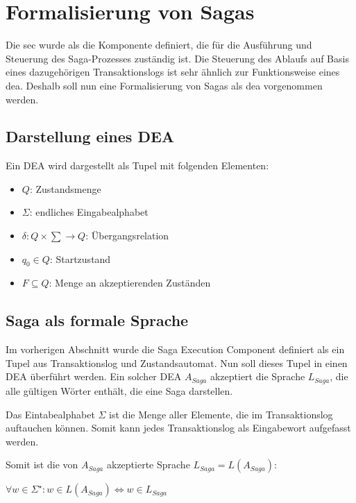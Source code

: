 \section{Formalisierung von Sagas} \label{sec_saga_formalisierung_dea}

Die \acrshort{sec} wurde als die Komponente definiert, die für die Ausführung und Steuerung des Saga-Prozesses zuständig ist. Die Steuerung des Ablaufs auf Basis eines dazugehörigen Transaktionslogs ist sehr ähnlich zur Funktionsweise eines \acrfull{dea}. Deshalb soll nun eine Formalisierung von Sagas als \acrshort{dea} vorgenommen werden.

\subsection{Darstellung eines DEA}
Ein DEA wird dargestellt als Tupel mit folgenden Elementen:
\begin{itemize}
	\item $Q$: Zustandsmenge
	\item $\Sigma$: endliches Eingabealphabet
	\item $\delta: Q \times \sum \rightarrow Q$: Übergangsrelation 
	\item $q_0 \in Q$: Startzustand
	\item $F \subseteq Q$: Menge an akzeptierenden Zuständen
\end{itemize}

\subsection{Saga als formale Sprache}
Im vorherigen Abschnitt wurde die Saga Execution Component definiert als ein Tupel aus Transaktionslog und Zustandsautomat. Nun soll dieses Tupel in einen DEA überführt werden. Ein solcher DEA $A_{Saga}$ akzeptiert die Sprache $L_{Saga}$, die alle gültigen Wörter enthält, die eine Saga darstellen.

Das Eintabealphabet $\Sigma$ ist die Menge aller Elemente, die im Transaktionslog auftauchen können. Somit kann jedes Transaktionslog als Eingabewort aufgefasst werden. 

Somit ist die von $A_{Saga}$ akzeptierte Sprache $L_{Saga} = L(A_{Saga})$: \\

\begin{center}
	$\forall w \in \Sigma^{\star}: w \in L(A_{Saga}) \iff w \in L_{Saga}$
\end{center}

